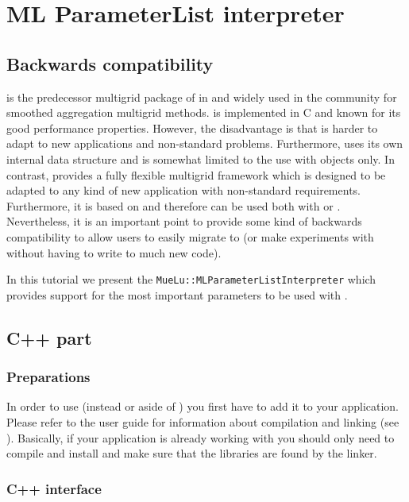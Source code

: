 \documentclass[10pt,fleqn]{book}
\begin{document}
\chapter{ML ParameterList interpreter}

\section{Backwards compatibility}
\ml \cite{mlguide} is the predecessor multigrid package of \muelu in \trilinos and widely used in the community for smoothed aggregation multigrid methods. \ml is implemented in C and known for its good performance properties. However, the disadvantage is that \ml is harder to adapt to new applications and non-standard problems. Furthermore, \ml uses its own internal data structure and is somewhat limited to the use with \epetra objects only. In contrast, \muelu provides a fully flexible multigrid framework which is designed to be adapted to any kind of new application with non-standard requirements. Furthermore, it is based on \xpetra and therefore can be used both with \epetra or \tpetra. Nevertheless, it is an important point to provide some kind of backwards compatibility to allow \ml users to easily migrate to \muelu (or make experiments with \muelu without having to write to much new code).

In this tutorial we present the \texttt{MueLu::MLParameterListInterpreter} which provides support for the most important \ml parameters to be used with \muelu.

\section{C++ part}

\subsection{Preparations}
In order to use \muelu (instead or aside of \ml) you first have to add it to your application. Please refer to the \muelu user guide for information about compilation and linking (see \cite{Mue}). Basically, if your application is already working with \ml you should only need to compile and install \muelu and make sure that the \muelu libraries are found by the linker.

\subsection{C++ interface}
\end{document}
